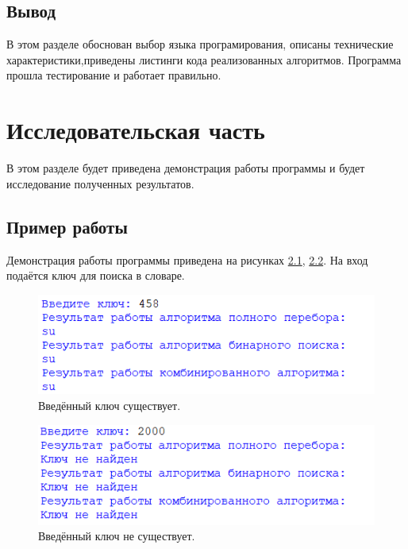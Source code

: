 \documentclass[12pt]{report}
\begin{document}
\section{Вывод}
В этом разделе обоснован выбор языка програмирования, описаны технические характеристики,приведены листинги кода реализованных алгоритмов. Программа прошла тестирование и работает правильно.


\chapter{Исследовательская часть}

В этом разделе будет приведена демонстрация работы программы и будет исследование полученных результатов.

\section{Пример работы}

Демонстрация работы программы приведена на рисунках \ref{fig:prog_show1}, \ref{fig:prog_show2}. На вход подаётся ключ для поиска в словаре.

\begin{figure}[h]
	\begin{center}
		\includegraphics[scale=0.8]{prim1.png}
		\caption{Введённый ключ существует.}
		\label{fig:prog_show1}
	\end{center}
\end{figure}

\begin{figure}[h]
	\begin{center}
		\includegraphics[scale=0.8]{prim2.png}
		\caption{Введённый ключ не существует.}
		\label{fig:prog_show2}
	\end{center}
\end{figure}
\end{document}
